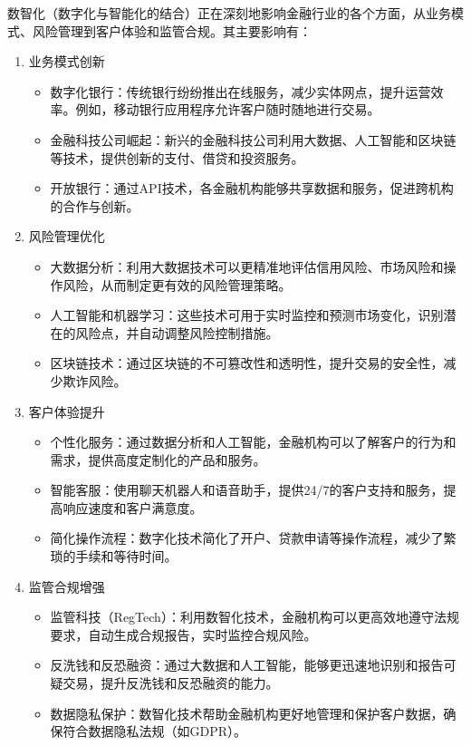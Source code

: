 \documentclass{article}
\begin{document}
数智化（数字化与智能化的结合）正在深刻地影响金融行业的各个方面，从业务模式、风险管理到客户体验和监管合规。其主要影响有：
\begin{enumerate}
  \item 业务模式创新
  \begin{itemize}
    \item   数字化银行：传统银行纷纷推出在线服务，减少实体网点，提升运营效率。例如，移动银行应用程序允许客户随时随地进行交易。
    \item   金融科技公司崛起：新兴的金融科技公司利用大数据、人工智能和区块链等技术，提供创新的支付、借贷和投资服务。
    \item   开放银行：通过API技术，各金融机构能够共享数据和服务，促进跨机构的合作与创新。
  \end{itemize}
  \item 风险管理优化
  \begin{itemize}
    \item 大数据分析：利用大数据技术可以更精准地评估信用风险、市场风险和操作风险，从而制定更有效的风险管理策略。
    \item 人工智能和机器学习：这些技术可用于实时监控和预测市场变化，识别潜在的风险点，并自动调整风险控制措施。
    \item 区块链技术：通过区块链的不可篡改性和透明性，提升交易的安全性，减少欺诈风险。
  \end{itemize}
  
  \item  客户体验提升
  \begin{itemize}
    \item 个性化服务：通过数据分析和人工智能，金融机构可以了解客户的行为和需求，提供高度定制化的产品和服务。
    \item 智能客服：使用聊天机器人和语音助手，提供24/7的客户支持和服务，提高响应速度和客户满意度。
    \item  简化操作流程：数字化技术简化了开户、贷款申请等操作流程，减少了繁琐的手续和等待时间。
  \end{itemize}
  \item 监管合规增强
  \begin{itemize}
    \item  监管科技（RegTech）：利用数智化技术，金融机构可以更高效地遵守法规要求，自动生成合规报告，实时监控合规风险。
    \item 反洗钱和反恐融资：通过大数据和人工智能，能够更迅速地识别和报告可疑交易，提升反洗钱和反恐融资的能力。
    \item 数据隐私保护：数智化技术帮助金融机构更好地管理和保护客户数据，确保符合数据隐私法规（如GDPR）。
  \end{itemize}
\end{enumerate}
\end{document}
